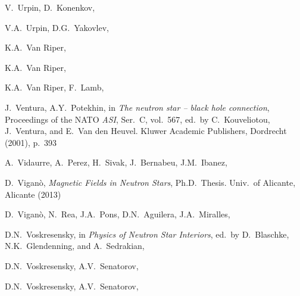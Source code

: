 \documentclass[smallextended]{svjour3}       %
\begin{document}
\begin{thebibliography}{}
V.~Urpin, D.~Konenkov,

V.A.~Urpin, D.G.~Yakovlev,

K.A.~Van Riper,

K.A.~Van Riper,

K.A.~Van Riper, F.~Lamb,

J.~Ventura, A.Y.~Potekhin,
in
\textit{The neutron star -- black hole connection},
Proceedings of the NATO \textit{ASI}, Ser.~C, vol.~567,
ed.~by C.~Kouveliotou, J.~Ventura, and E.~Van den Heuvel.
Kluwer Academic Publishers, Dordrecht (2001), p.~393

A.~Vidaurre, A.~Perez, H.~Sivak, J.~Bernabeu, J.M.~Ibanez, 

D.~Vigan{\`o},
\textit{Magnetic Fields in Neutron Stars},
Ph.D.\ Thesis. Univ.\ of Alicante, Alicante (2013)

D.~Vigan{\`o}, N.~Rea, J.A.~Pons, D.N.~Aguilera, 
J.A.~Miralles,

D.N.~Voskresensky,
in
\textit{Physics of Neutron Star Interiors},
ed.~by D.~Blaschke, N.K.~Glendenning, and A.~Sedrakian, 

D.N.~Voskresensky, A.V.~Senatorov,

D.N.~Voskresensky, A.V.~Senatorov,


\end{thebibliography}
\end{document}
